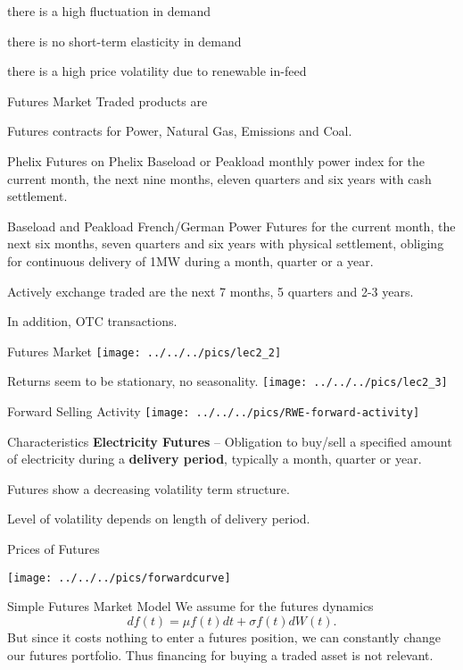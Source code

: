 	there is a high fluctuation in demand 
	
	there is no short-term elasticity in demand 
	
	there is a high price volatility due to renewable in-feed 


Futures Market 
	Traded products are 

	Futures contracts for Power, Natural Gas, Emissions and Coal. 

	Phelix Futures on Phelix Baseload or Peakload monthly power index
	for the current month, the next nine months, eleven quarters and six
	years with cash settlement. 

	Baseload and Peakload French/German Power Futures for the current
	month, the next six months, seven quarters and six years with physical
	settlement, obliging for continuous delivery of 1MW during a month,
	quarter or a year. 

	Actively exchange traded are the next 7 months, 5 quarters and 2-3 years. 

	In addition, OTC transactions. 




Futures Market
	\texttt{[image: ../../../pics/lec2\_2]}

	Returns seem to be stationary, no seasonality.
	\texttt{[image: ../../../pics/lec2\_3]}

	Forward Selling Activity 
	\texttt{[image: ../../../pics/RWE-forward-activity]}


Characteristics 
 \textbf{Electricity Futures} -- Obligation to buy/sell a specified amount of electricity during a \textbf{delivery period}, typically a month, quarter or year. 

 Futures show a decreasing volatility term structure. 

 Level of volatility depends on length of delivery period. 


Prices of Futures 
	\begin{center}
	\texttt{[image: ../../../pics/forwardcurve]}
	\end{center}


Simple Futures Market Model 
	We assume for the futures dynamics 
	$$
	df(t)=\mu f(t)dt+\sigma f(t)dW(t).
	$$
	But since it costs nothing to enter a futures position, we can constantly change our futures portfolio. Thus financing for buying a traded asset is not relevant. 


